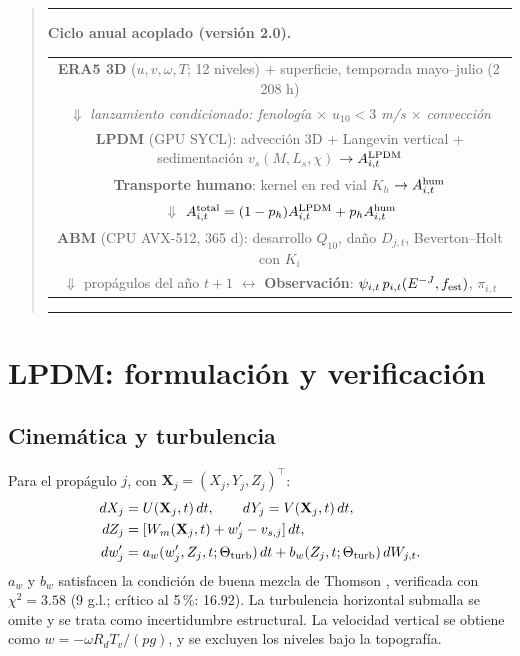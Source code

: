 \documentclass[11pt,letterpaper]{article}
\newenvironment{keybox}{\begin{quote}\color{navy}\hrule\vspace{2mm}}{\vspace{2mm}\hrule\end{quote}}
\begin{document}
\begin{keybox}
\textbf{Ciclo anual acoplado (versión 2.0).}
\begin{center}\footnotesize
\begin{tabular}{c}
\textbf{ERA5 3D} ($u,v,\omega,T$; 12 niveles) + superficie, temporada mayo--julio (2\,208 h) \\
$\Downarrow$ \textit{lanzamiento condicionado: fenología $\times$ $u_{10}<3$ m/s $\times$ convección} \\
\textbf{LPDM} (GPU SYCL): advección 3D + Langevin vertical + sedimentación $v_s(M,L_s,\chi)$ $\to A^{\rm LPDM}_{i,t}$ \\
\textbf{Transporte humano}: kernel en red vial $K_h$ $\to A^{\rm hum}_{i,t}$ \\
$\Downarrow$ \quad $A^{\rm total}_{i,t}=(1-p_h)A^{\rm LPDM}_{i,t}+p_hA^{\rm hum}_{i,t}$ \\
\textbf{ABM} (CPU AVX-512, 365 d): desarrollo $Q_{10}$, daño $D_{j,t}$, Beverton--Holt con $K_i$ \\
$\Downarrow$ \quad propágulos del año $t+1$ \quad $\longleftrightarrow$ \quad \textbf{Observación}: $\psi_{i,t}\,p_{i,t}(E^{-J},f_{\rm est})$, $\pi_{i,t}$
\end{tabular}
\end{center}
\end{keybox}

\section{LPDM: formulación y verificación}
\subsection{Cinemática y turbulencia}
Para el propágulo $j$, con $\mathbf X_j=(X_j,Y_j,Z_j)^\top$:
\begin{align}
dX_j&=U(\mathbf X_j,t)\,dt,\qquad dY_j=V(\mathbf X_j,t)\,dt,\\
dZ_j&=[W_m(\mathbf X_j,t)+w'_j-v_{s,j}]\,dt,\\
dw'_j&=a_w(w'_j,Z_j,t;\Theta_{\rm turb})\,dt+b_w(Z_j,t;\Theta_{\rm turb})\,dW_{j,t}.
\end{align}
$a_w$ y $b_w$ satisfacen la condición de buena mezcla de Thomson \cite{thomson1987}, verificada con $\chi^2=3.58$ (9 g.l.; crítico al 5\,\%: 16.92). La turbulencia horizontal submalla se omite y se trata como incertidumbre estructural. La velocidad vertical se obtiene como $w=-\omega R_dT_v/(pg)$, y se excluyen los niveles bajo la topografía.
\end{document}
